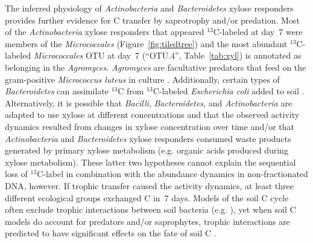 \documentclass{article}
\begin{document}
The inferred physiology of \textit{Actinobacteria} and \textit{Bacteroidetes}
xylose responders provides further evidence for C transfer by
saprotrophy and/or predation. Most of the \textit{Actinobacteria} xylose
responders that appeared $^{13}$C-labeled at day~7 were members of the
\textit{Micrococcales} (Figure~\ref{fig:tiledtree}) and the most abundant
$^{13}$C-labeled \textit{Micrococcales} OTU at day~7 (“OTU.4”,
Table~\ref{tab:xyl}) is annotated as belonging in the \textit{Agromyces}.
\textit{Agromyces} are facultative predators that feed on the gram-positive
\textit{Micrococcus luteus} in culture \citep{16346402}. Additionally, certain types
of \textit{Bacteroidetes} can assimilate $^{13}$C from $^{13}$C-labeled
\textit{Escherichia coli} added to soil \citep{Lueders2006}.
Alternatively, it is possible that \textit{Bacilli},
\textit{Bacteroidetes}, and \textit{Actinobacteria} are adapted to use
xylose at different concentrations and that the observed activity dynamics
resulted from changes in xylose concentration over time and/or that
\textit{Actinobacteria} and \textit{Bacteroidetes} xylose responders
consumed waste products generated by primary xylose metabolism (e.g.
organic acids produced during xylose metabolism). These latter two
hypotheses cannot explain the sequential loss of $^{13}$C-label in combination
with the abundance dynamics in non-fractionated DNA, however.
If trophic transfer caused the activity dynamics, at least three different
ecological groups exchanged C in~7 days. Models of the soil C cycle often
exclude trophic interactions between soil bacteria (e.g.
\citep{Moore1988}), yet when soil C models do account for predators and/or
saprophytes, trophic interactions are predicted to have significant
effects on the fate of soil C \citep{Kaiser2014a}. 
\end{document}
